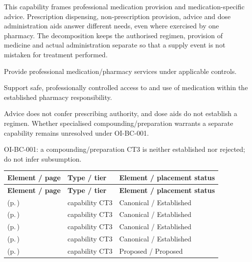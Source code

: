 This capability frames professional medication provision and medication-specific advice. Prescription dispensing, non-prescription provision, advice and dose administration aids answer different needs, even where exercised by one pharmacy. The decomposition keeps the authorised regimen, provision of medicine and actual administration separate so that a supply event is not mistaken for treatment performed.



Provide professional medication/\allowbreak{}pharmacy services under applicable controls.



Support safe, professionally controlled access to and use of medication within the established pharmacy responsibility.



Advice does not confer prescribing authority, and dose aids do not establish a regimen. Whether specialised compounding/\allowbreak{}preparation warrants a separate capability remains unresolved under OI-BC-001.



OI-BC-001: a compounding/\allowbreak{}preparation CT3 is neither established nor rejected; do not infer subsumption.


\begingroup\small\setlength{\TableWidth}{\dimexpr\linewidth-6\tabcolsep-4\arrayrulewidth\relax}
\begin{longtable}{|>{\raggedright\arraybackslash}p{0.52\TableWidth}|>{\raggedright\arraybackslash}p{0.2\TableWidth}|>{\raggedright\arraybackslash}p{0.28\TableWidth}|}
\hline\rowcolor{TableHead}\textbf{Element / page} & \textbf{Type / tier} & \textbf{Element / placement status}\\\hline\endfirsthead
\hline\rowcolor{TableHead}\textbf{Element / page} & \textbf{Type / tier} & \textbf{Element / placement status}\\\hline\endhead
\hline\endfoot
\nameref{cap:bc-prescription-medication-dispensing} (p.\,\pageref{cap:bc-prescription-medication-dispensing}) & capability CT3 & Canonical / Established\\\hline
\nameref{cap:bc-non-prescription-medication-provision} (p.\,\pageref{cap:bc-non-prescription-medication-provision}) & capability CT3 & Canonical / Established\\\hline
\nameref{cap:bc-medication-advice} (p.\,\pageref{cap:bc-medication-advice}) & capability CT3 & Canonical / Established\\\hline
\nameref{cap:bc-medication-dose-administration-aid-provision} (p.\,\pageref{cap:bc-medication-dose-administration-aid-provision}) & capability CT3 & Canonical / Established\\\hline
\nameref{cap:bc-medication-compounding-preparation} (p.\,\pageref{cap:bc-medication-compounding-preparation}) & capability CT3 & Proposed / Proposed\\\hline
\end{longtable}\endgroup

